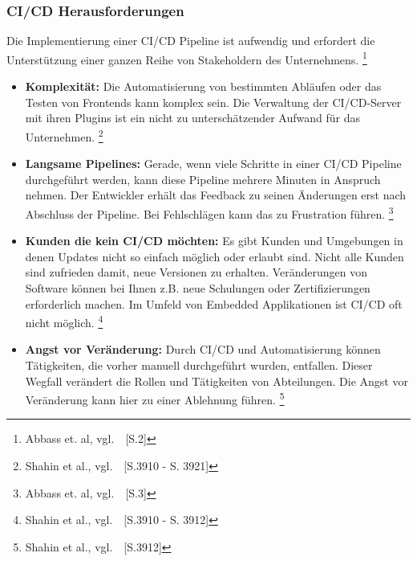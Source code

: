 \subsubsection{CI/CD Herausforderungen}\label{ci_cd_herausforderungen}

Die Implementierung einer CI/CD Pipeline ist aufwendig und erfordert die Unterstützung einer ganzen Reihe von Stakeholdern des Unternehmens.
\footnote{Abbass et. al, vgl.~\cite{Abbass2019}~[S.2]}

\begin{itemize}
    \item \textbf{Komplexität:}
    Die Automatisierung von bestimmten Abläufen oder das Testen von Frontends kann komplex sein.
    Die Verwaltung der CI/CD-Server mit ihren Plugins ist ein nicht zu unterschätzender Aufwand für das Unternehmen.
    \footnote{Shahin et al., vgl.~\cite{Shahin2017}~[S.3910 - S. 3921]}

    \item \textbf{Langsame Pipelines:}
    Gerade, wenn viele Schritte in einer CI/CD Pipeline durchgeführt werden, kann diese Pipeline mehrere Minuten in Anspruch nehmen.
    Der Entwickler erhält das Feedback zu seinen Änderungen erst nach Abschluss der Pipeline.
    Bei Fehlschlägen kann das zu Frustration führen.
    \footnote{Abbass et. al, vgl.~\cite{Abbass2019}~[S.3]}

    \item \textbf{Kunden die kein CI/CD möchten:}
    Es gibt Kunden und Umgebungen in denen Updates nicht so einfach möglich oder erlaubt sind.
    Nicht alle Kunden sind zufrieden damit, neue Versionen zu erhalten.
    Veränderungen von Software können bei Ihnen z.B. neue Schulungen oder Zertifizierungen erforderlich machen.
    Im Umfeld von Embedded Applikationen ist CI/CD oft nicht möglich.
    \footnote{Shahin et al., vgl.~\cite{Shahin2017}~[S.3910 - S. 3912]}

    \item \textbf{Angst vor Veränderung:}
    Durch CI/CD und Automatisierung können Tätigkeiten, die vorher manuell durchgeführt wurden, entfallen.
    Dieser Wegfall verändert die Rollen und Tätigkeiten von Abteilungen.
    Die Angst vor Veränderung kann hier zu einer Ablehnung führen.
    \footnote{Shahin et al., vgl.~\cite{Shahin2017}~[S.3912]}

\end{itemize}


